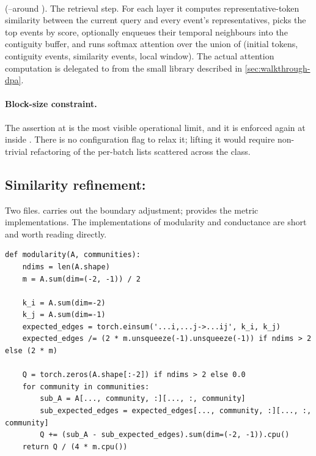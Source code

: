 \paragraph{} (--around ). The retrieval step. For each layer it computes representative-token similarity between the current query and every event's representatives, picks the top events by score, optionally enqueues their temporal neighbours into the contiguity buffer, and runs softmax attention over the union of (initial tokens, contiguity events, similarity events, local window). The actual attention computation is delegated to  from the small library described in \cref{sec:walkthrough-dpa}.

\paragraph{Block-size constraint.} The  assertion at  is the most visible operational limit, and it is enforced again at  inside . There is no configuration flag to relax it; lifting it would require non-trivial refactoring of the per-batch lists scattered across the class.

\subsection{Similarity refinement: }
\label{sec:walkthrough-similarity}

Two files.  carries out the boundary adjustment;  provides the metric implementations. The implementations of modularity and conductance are short and worth reading directly.

\begin{lstlisting}[caption={Modularity. \file{em\_llm/attention/similarity\_refinement/similarity.py:3}--\file{similarity.py:28}. The implementation matches \cref{eq:modularity}; \code{k\_i} and \code{k\_j} carry the degree sums, \code{expected\_edges} is the null-model term.},captionpos=b]
def modularity(A, communities):
    ndims = len(A.shape)
    m = A.sum(dim=(-2, -1)) / 2

    k_i = A.sum(dim=-2)
    k_j = A.sum(dim=-1)
    expected_edges = torch.einsum('...i,...j->...ij', k_i, k_j)
    expected_edges /= (2 * m.unsqueeze(-1).unsqueeze(-1)) if ndims > 2 else (2 * m)

    Q = torch.zeros(A.shape[:-2]) if ndims > 2 else 0.0
    for community in communities:
        sub_A = A[..., community, :][..., :, community]
        sub_expected_edges = expected_edges[..., community, :][..., :, community]
        Q += (sub_A - sub_expected_edges).sum(dim=(-2, -1)).cpu()
    return Q / (4 * m.cpu())
\end{lstlisting}

